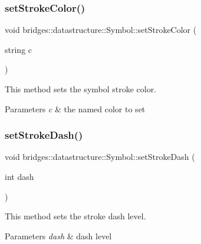 \subsubsection{\texorpdfstring{set\+Stroke\+Color()}{setStrokeColor()}\hspace{0.1cm}{\footnotesize\ttfamily [2/2]}}
{\footnotesize\ttfamily void bridges\+::datastructure\+::\+Symbol\+::set\+Stroke\+Color (\begin{DoxyParamCaption}\item[{string}]{c }\end{DoxyParamCaption})\hspace{0.3cm}{\ttfamily [inline]}}



This method sets the symbol stroke color. 


\begin{DoxyParams}{Parameters}
{\em c} & the named color to set \\
\hline
\end{DoxyParams}
\mbox{\label{classbridges_1_1datastructure_1_1_symbol_afd39d3b65d22bc2a1be64c8728f5e5d7}} 
\subsubsection{\texorpdfstring{set\+Stroke\+Dash()}{setStrokeDash()}}
{\footnotesize\ttfamily void bridges\+::datastructure\+::\+Symbol\+::set\+Stroke\+Dash (\begin{DoxyParamCaption}\item[{int}]{dash }\end{DoxyParamCaption})\hspace{0.3cm}{\ttfamily [inline]}}



This method sets the stroke dash level. 


\begin{DoxyParams}{Parameters}
{\em dash} & dash level \\
\hline
\end{DoxyParams}
\mbox{\label{classbridges_1_1datastructure_1_1_symbol_a56238a4535a26bc3eea698eea4b65921}} 
